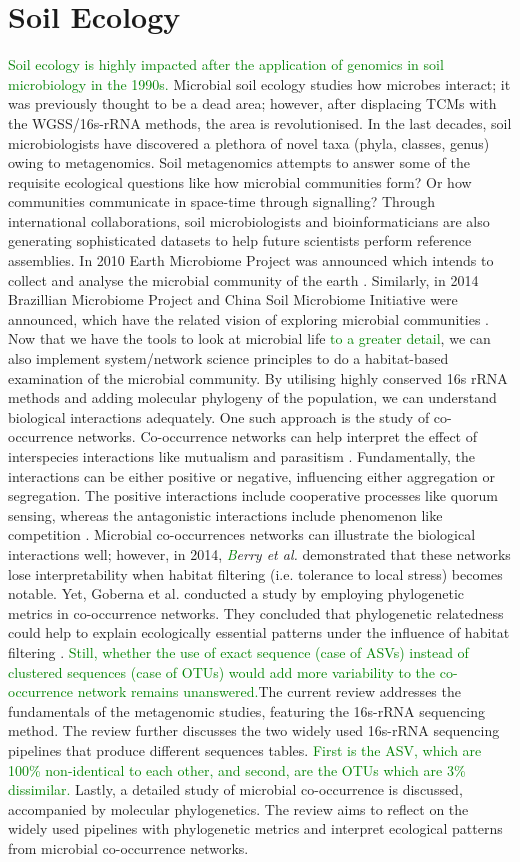\section{Soil Ecology}
\textcolor{green}{Soil ecology is highly impacted after the application of genomics in soil microbiology in the 1990s.} Microbial soil ecology studies how microbes interact; it was previously thought to be a dead area; however, after displacing TCMs with the WGSS/16s-rRNA methods, the area is revolutionised. In the last decades, soil microbiologists have discovered a plethora of novel taxa (phyla, classes, genus) owing to metagenomics. Soil metagenomics attempts to answer some of the requisite ecological questions like how microbial communities form? Or how communities communicate in space-time through signalling? Through international collaborations, soil microbiologists and bioinformaticians are also generating sophisticated datasets to help future scientists perform reference assemblies. In 2010 Earth Microbiome Project was announced which intends to collect and analyse the microbial community of the earth \cite{ref6}. Similarly, in 2014 Brazillian Microbiome Project and China Soil Microbiome Initiative were announced, which have the related vision of exploring microbial communities \cite{ref7}\cite{ref8}. Now that we have the tools to look at microbial life \textcolor{green}{to a greater detail}, we can also implement system/network science principles to do a habitat-based examination of the microbial community. By utilising highly conserved 16s rRNA methods and adding molecular phylogeny of the population, we can understand biological interactions adequately. One such approach is the study of co-occurrence networks. Co-occurrence networks can help interpret the effect of interspecies interactions like mutualism and parasitism \cite{ref9}. Fundamentally, the interactions can be either positive or negative, influencing either aggregation or segregation. The positive interactions include cooperative processes like quorum sensing, whereas the antagonistic interactions include phenomenon like competition \cite{ref9}. Microbial co-occurrences networks can illustrate the biological interactions well; however, in 2014, \emph{\textcolor{green}{B}erry et al.} demonstrated that these networks lose interpretability when habitat filtering (i.e. tolerance to local stress) becomes notable. Yet, Goberna et al. conducted a study by employing phylogenetic metrics in co-occurrence networks. They concluded that phylogenetic relatedness could help to explain ecologically essential patterns under the influence of habitat filtering \cite{ref10}. \textcolor{green}{Still, whether the use of exact sequence (case of ASVs) instead of clustered sequences (case of OTUs) would add more variability to the co-occurrence network remains unanswered.}\newline \newline The current review addresses the fundamentals of the metagenomic studies, featuring the 16s-rRNA sequencing method. The review further discusses the two widely used 16s-rRNA sequencing pipelines that produce different sequences tables. \textcolor{green}{First is the ASV, which are 100\% non-identical to each other, and second, are the OTUs which are 3\% dissimilar.} Lastly, a detailed study of microbial co-occurrence is discussed, accompanied by molecular phylogenetics. The review aims to reflect on the widely used pipelines with phylogenetic metrics and interpret ecological patterns from microbial co-occurrence networks.